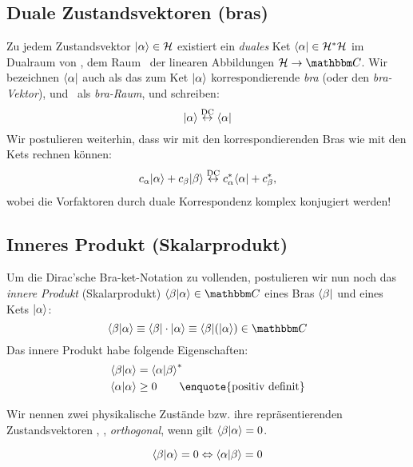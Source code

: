 \subsection{Duale Zustandsvektoren (bras)}
\begin{post}
 Zu jedem Zustandsvektor $\keta \in \hs$ existiert ein \emph{duales} Ket $\braa \in \ds{\hs}$ im Dualraum von \hs, dem Raum \ds{\hs}\ der linearen Abbildungen $\hs \rightarrow \comps$. Wir bezeichnen $\braa$ auch als das zum Ket $\keta$ korrespondierende \emph{bra} (oder den \emph{bra-Vektor}), und \ds{\hs}\ als \emph{bra-Raum}, und schreiben:
\begin{equation}
 \keta \dc \braa
\end{equation}
 Wir postulieren weiterhin, dass wir mit den korrespondierenden Bras wie mit den Kets rechnen k\"onnen:
\begin{equation}
 c_{\alpha} \keta + c_{\beta} \ketb \dc \cc{c_{\alpha}} \braa + \cc{c_{\beta}} ,
\end{equation}
wobei die Vorfaktoren durch duale Korrespondenz komplex konjugiert werden!
\end{post}

\subsection{Inneres Produkt (Skalarprodukt)}
\begin{post}
 Um die Dirac'sche Bra-ket-Notation zu vollenden, postulieren wir nun noch das \emph{innere Produkt} (Skalarprodukt) $\braket{\beta | \alpha} \in \comps$ eines Bras $\brab$ und eines Kets $\keta$:
\begin{equation}
 \braket{\beta | \alpha} \equiv \brab \cdot \keta \equiv \brab ( \keta ) \in \comps
\end{equation}
Das innere Produkt habe folgende Eigenschaften:
\begin{align}
 \braket{\beta | \alpha} &= \cc{\braket{\alpha | \beta}} \\
\braket{\alpha | \alpha} &\geq 0 \qquad \text{\enquote{positiv definit}} 
\end{align}

\end{post}
 
\begin{defn}
 Wir nennen zwei physikalische Zust\"ande bzw. ihre repr\"asentierenden Zustandsvektoren \keta, \ketb, \emph{orthogonal}, wenn gilt $\braket{\beta | \alpha} = 0$.
\end{defn}
\begin{notiz}
 \begin{equation}
  \braket{\beta | \alpha} = 0 \Leftrightarrow \braket{\alpha | \beta} = 0
 \end{equation}
\end{notiz}

